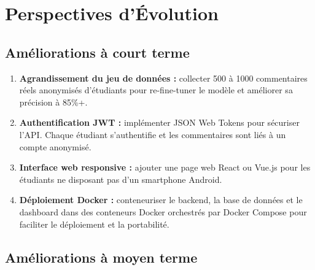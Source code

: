 \section{Perspectives d'Évolution}

\subsection{Améliorations à court terme}

\begin{enumerate}
  \item \textbf{Agrandissement du jeu de données :} collecter 500 à 1000
        commentaires réels anonymisés d'étudiants pour re-fine-tuner le modèle
        et améliorer sa précision à 85\%+.

  \item \textbf{Authentification JWT :} implémenter JSON Web Tokens pour
        sécuriser l'API. Chaque étudiant s'authentifie et les commentaires
        sont liés à un compte anonymisé.

  \item \textbf{Interface web responsive :} ajouter une page web React ou
        Vue.js pour les étudiants ne disposant pas d'un smartphone Android.

  \item \textbf{Déploiement Docker :} conteneuriser le backend, la base de
        données et le dashboard dans des conteneurs Docker orchestrés par
        Docker Compose pour faciliter le déploiement et la portabilité.
\end{enumerate}

\subsection{Améliorations à moyen terme}

